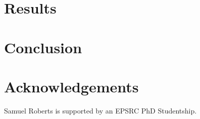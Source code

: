 \documentclass[conference]{IEEEtran}
\begin{document}
\section{Results}


\section{Conclusion}

 
\section*{Acknowledgements}
Samuel Roberts is supported by an EPSRC PhD Studentship.



\end{document}
